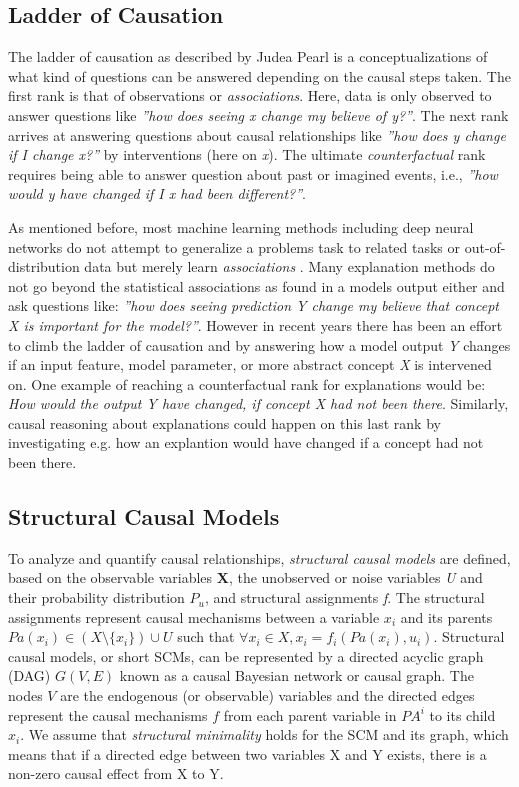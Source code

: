 \subsection{Ladder of Causation}
The ladder of causation as described by Judea Pearl \cite{Pearl2009} is a conceptualizations of what kind of questions can be answered depending on the causal steps taken.
The first rank is that of observations or \textit{associations}. Here, data is only observed to answer questions like \textit{''how does seeing x change my believe of y?''}.
The next rank arrives at answering questions about causal relationships like \textit{''how does y change if I change x?''} by interventions (here on \textit{x}). The ultimate \textit{counterfactual} rank requires being able to answer question about past or imagined events, i.e., \textit{''how would y have changed if I x had been different?''}.

As mentioned before, most machine learning methods including deep neural networks do not attempt to generalize a problems task to related tasks or out-of-distribution data but merely learn \textit{associations} \cite{Schoelkopf2019}. Many explanation methods do not go beyond the statistical associations as found in a models output either and ask questions like: \textit{''how does seeing prediction Y change my believe that concept X is important for the model?''}. However in recent years there has been an effort to climb the ladder of causation and by answering how a model output \textit{Y} changes if an input feature, model parameter, or more abstract concept \textit{X} is intervened on. One example of reaching a counterfactual rank for explanations would be: \textit{How would the output Y have changed, if concept X had not been there}. Similarly, causal reasoning about explanations could happen on this last rank by investigating e.g. how an explantion would have changed if a concept had not been there. 

\subsection{Structural Causal Models}
To analyze and quantify causal relationships, \textit{structural causal models} are defined, based on the observable variables \textbf{X}, the unobserved or noise variables \textit{U} and their probability distribution $P_u$, and structural assignments \textit{f}. The structural assignments represent causal mechanisms between a variable $x_i$ and its parents $Pa(x_i) \in (X \setminus \{x_i\}) \cup U$  such that $\forall x_i \in X, x_i = f_i(Pa(x_i),u_i)$. 
Structural causal models, or short SCMs, can be represented by a directed acyclic graph (DAG) $G(V,E)$ known as a causal Bayesian network or causal graph. The nodes $V$ are the endogenous (or observable) variables and the directed edges represent the causal mechanisms $f$ from each parent variable in $PA^i$ to its child $x_i$. We assume that \textit{structural minimality} holds for the SCM and its graph, which means that if a directed edge between two variables X and Y exists, there is a non-zero causal effect from X to Y. 


